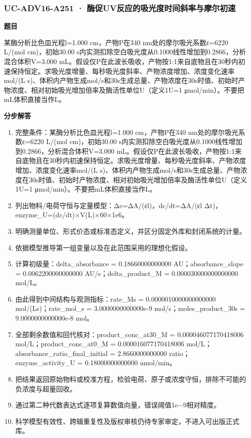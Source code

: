 \documentclass[UTF8,11pt,a4paper]{ctexart}
\begin{document}
\subsubsection*{UC-ADV16-A251 · 酶促UV反应的吸光度时间斜率与摩尔初速}
\noindent\textbf{题目}\par
某酶分析比色皿光程l=1.000 cm，产物P在340 nm处的摩尔吸光系数ε=6220 L/(mol cm)，初始30.00 s内实测扣除空白吸光度从0.1000线性增加到0.2866，分析混合体积V=3.000 mL。假设仅P在此波长吸收，产物按1:1来自底物且在30秒内初速保持恒定。求吸光度增量、每秒吸光度斜率、产物浓度增加、浓度变化速率mol/(L s)、体积内产物生成mol/s和30s生成总量、产物浓度在30s时值、初始时产物浓度、相对初始吸光增加倍率及酶活性单位U（定义1U=1 μmol/min）。不要把mL体积直接当作L。\par
\medskip\noindent\textbf{分步解答}
\begin{enumerate}
\item 完整条件：某酶分析比色皿光程l=1.000 cm，产物P在340 nm处的摩尔吸光系数ε=6220 L/(mol cm)，初始30.00 s内实测扣除空白吸光度从0.1000线性增加到0.2866，分析混合体积V=3.000 mL。假设仅P在此波长吸收，产物按1:1来自底物且在30秒内初速保持恒定。求吸光度增量、每秒吸光度斜率、产物浓度增加、浓度变化速率mol/(L s)、体积内产物生成mol/s和30s生成总量、产物浓度在30s时值、初始时产物浓度、相对初始吸光增加倍率及酶活性单位U（定义1U=1 μmol/min）。不要把mL体积直接当作L。
\item 列出物料/电荷守恒与定量模型：Δc=ΔA/(εl)，dc/dt=ΔA/(εl Δt)，enzyme\_U=(dc/dt)×V(L)×60×1e6。
\item 明确测量单位、形式价态或标准态定义，并区分固定外库和封闭系统的计量。
\item 依据模型推导第一组变量以及在此范围采用的理想化假设。
\item 计算初级量：delta\_absorbance = 0.18660000000000 AU；absorbance\_slope = 0.0062200000000000 AU/s；delta\_product\_M = 0.000030000000000000 mol/L。
\item 由此得到中间结构与观测指标：rate\_Ms = 0.0000010000000000000 mol/(Ls)；rate\_mol\_s = 3.0000000000000e-9 mol/s；moles\_product\_30s = 9.0000000000000e-8 mol。
\item 全部剩余数值和回代核对：product\_conc\_at30\_M = 0.000046077170418006 mol/L；product\_conc\_at0\_M = 0.000016077170418006 mol/L；absorbance\_ratio\_final\_initial = 2.8660000000000 ratio；enzyme\_activity\_U = 0.18000000000000 umol/min。
\item 把结果返回原始物料或校准方程，检验电荷、原子或浓度守恒，排除不可能的负浓度与超量回收。
\item 通过第二种代数表达式逐项复算数值向量，错误阈值1e−9相对精度。
\item 科学模型有效性、跨辑重复性及版权审核仍待专家审定，不进入可出版正式库。
\end{enumerate}
\end{document}
